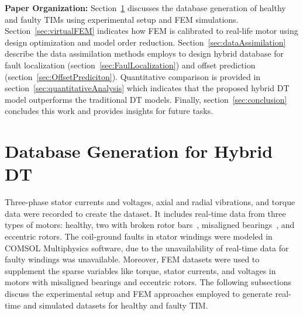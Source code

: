 \documentclass[a4paper,conference]{IEEEtran}
\begin{document}
\begin{table}[b!]
    \centering
    \setlength{\arrayrulewidth}{0.3pt} %
    \caption{PARAMETERS OF EXPERIMENTAL WORKBENCH OF TIM.}
    \label{tab:motor-specifications}
\end{table}

\textbf{Paper Organization:} Section~\ref{sec:databaseGeneration} discusses the database generation of healthy and faulty TIMs using experimental setup and FEM simulations. Section~\ref{sec:virtualFEM} indicates how FEM is calibrated to real-life motor using design optimization and model order reduction.
Section~\ref{sec:dataAssimilation} describe the data assimilation methods employs to design hybrid database for fault localization (section~\ref{sec:FaulLocalization}) and offset prediction (section~\ref{sec:OffsetPrediciton}). Quantitative comparison is provided in section~\ref{sec:quantitativeAnalysis} which indicates that the proposed hybrid DT model outperforms the traditional DT models. Finally, section~\ref{sec:conclusion} concludes this work and provides insights for future tasks. 


\section{Database Generation for Hybrid DT} \label{sec:databaseGeneration}
Three-phase stator currents and voltages, axial and radial vibrations, and torque data were recorded to create the dataset. It includes real-time data from three types of motors: healthy, two with broken rotor bars~\cite{Huang2018-rk}, misaligned bearings~\cite{fmnm-bn95-20}, and eccentric rotors. The coil-ground faults in stator windings were modeled in COMSOL Multiphysics software, due to the unavailability of real-time data for faulty windings was unavailable. Moreover, FEM datasets were used to supplement the sparse variables like torque, stator currents, and voltages in motors with misaligned bearings and eccentric rotors. The following subsections discuss the experimental setup and FEM approaches employed to generate real-time and simulated datasets for healthy and faulty TIM.
\end{document}
